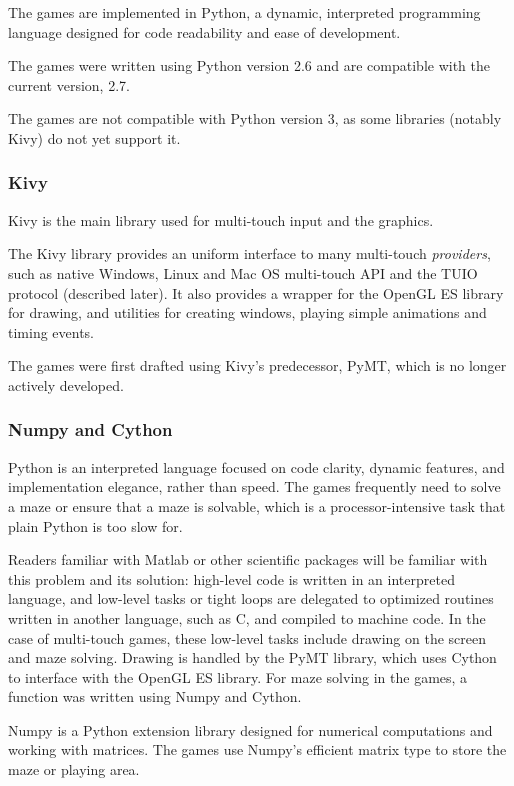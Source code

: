 \documentclass[a4paper,11pt]{article}
\begin{document}
The games are implemented in Python, a dynamic, interpreted programming
language designed for code readability and ease of development.

The games were written using Python version 2.6 and are compatible with
the current version, 2.7.

The games are not compatible with Python version 3, as some libraries (notably
Kivy) do not yet support it.

\subsubsection{Kivy}

Kivy is the main library used for multi-touch input and the graphics.

The Kivy library provides an uniform interface to many multi-touch
\emph{providers}, such as native Windows, Linux and Mac OS multi-touch API and
the TUIO protocol (described later).
It also provides a wrapper for the OpenGL ES library for drawing, and utilities
for creating windows, playing simple animations and timing events.

The games were first drafted using Kivy's predecessor, PyMT, which is
no longer actively developed.

\subsubsection{Numpy and Cython}

Python is an interpreted language focused on code clarity, dynamic features,
and implementation elegance, rather than speed.
The games frequently need to solve a maze or ensure that a maze is solvable,
which is a processor-intensive task that plain Python is too slow for.

Readers familiar with Matlab or other scientific packages will be familiar with
this problem and its solution: high-level code is written in an interpreted
language, and low-level tasks or tight loops are delegated to optimized
routines written in another language, such as C, and compiled to machine code.
In the case of multi-touch games, these low-level tasks include drawing on the
screen and maze solving.
Drawing is handled by the PyMT library, which uses Cython to interface with
the OpenGL ES library.
For maze solving in the games, a function was written using Numpy and Cython.

Numpy is a Python extension library designed for numerical computations and
working with matrices.
The games use Numpy's efficient matrix type to store the maze or playing area.
\end{document}
